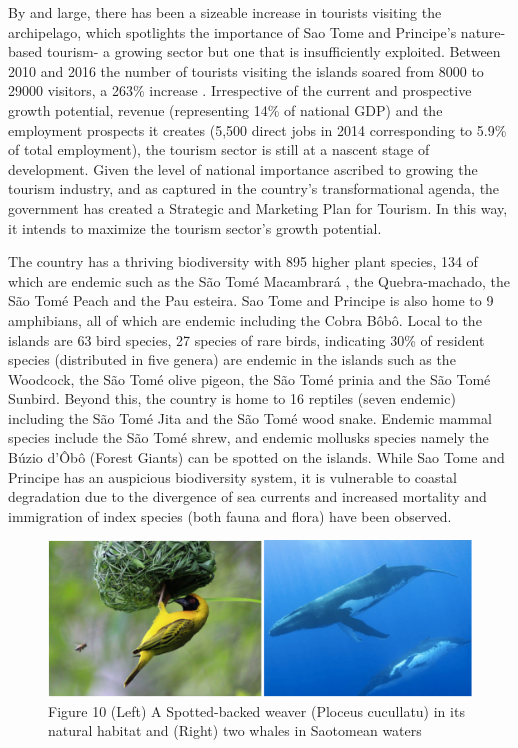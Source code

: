\documentclass[
]{book}
\begin{document}
By and large, there has been a sizeable increase in tourists visiting the archipelago, which spotlights the importance of Sao Tome and Principe's nature-based tourism- a growing sector but one that is insufficiently exploited. Between 2010 and 2016 the number of tourists visiting the islands soared from 8000 to 29000 visitors, a 263\% increase . Irrespective of the current and prospective growth potential, revenue (representing 14\% of national GDP) and the employment prospects it creates (5,500 direct jobs in 2014 corresponding to 5.9\% of total employment), the tourism sector is still at a nascent stage of development. Given the level of national importance ascribed to growing the tourism industry, and as captured in the country's transformational agenda, the government has created a Strategic and Marketing Plan for Tourism. In this way, it intends to maximize the tourism sector's growth potential.

The country has a thriving biodiversity with 895 higher plant species, 134 of which are endemic such as the São Tomé Macambrará , the Quebra-machado, the São Tomé Peach and the Pau esteira. Sao Tome and Principe is also home to 9 amphibians, all of which are endemic including the Cobra Bôbô. Local to the islands are 63 bird species, 27 species of rare birds, indicating 30\% of resident species (distributed in five genera) are endemic in the islands such as the Woodcock, the São Tomé olive pigeon, the São Tomé prinia and the São Tomé Sunbird. Beyond this, the country is home to 16 reptiles (seven endemic) including the São Tomé Jita and the São Tomé wood snake. Endemic mammal species include the São Tomé shrew, and endemic mollusks species namely the Búzio d'Ôbô (Forest Giants) can be spotted on the islands. While Sao Tome and Principe has an auspicious biodiversity system, it is vulnerable to coastal degradation due to the divergence of sea currents and increased mortality and immigration of index species (both fauna and flora) have been observed.

\begin{figure}
\centering
\includegraphics{images/bird_fish_tourism.png}
\caption{Figure 10 (Left) A Spotted-backed weaver (Ploceus cucullatu) in its natural habitat and (Right) two whales in Saotomean waters}
\end{figure}
\end{document}
